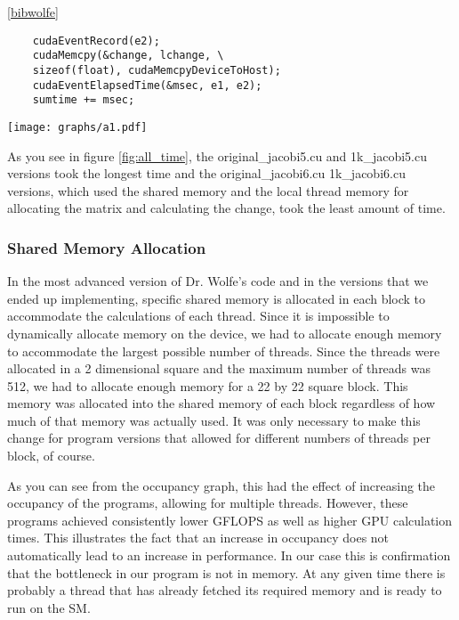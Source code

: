 \documentclass[10pt]{article}
\makeatletter
\newenvironment{figurehere}
{\def\@captype{figure}}
{}
\makeatother
\begin{document}
\begin{multicols}{2}
  \ref{bibwolfe}
  \begin{verbatim}
    cudaEventRecord(e2);
    cudaMemcpy(&change, lchange, \
    sizeof(float), cudaMemcpyDeviceToHost);
    cudaEventElapsedTime(&msec, e1, e2);
    sumtime += msec;
  \end{verbatim}

  \begin{figurehere}
    \centering
    \texttt{[image: graphs/a1.pdf]}
    \caption{}
    \label{fig:all_time}
  \end{figurehere}

  As you see in figure \ref{fig:all_time}, the original\_jacobi5.cu and 1k\_jacobi5.cu versions took the longest time and the original\_jacobi6.cu 1k\_jacobi6.cu versions, which used the shared memory and the local thread memory for allocating the matrix and calculating the change, took the least amount of time.

  \subsubsection{Shared Memory Allocation}%
  In the most advanced version of Dr. Wolfe's code and in the versions that we ended up implementing, specific shared memory is allocated in each block to accommodate the calculations of each thread.
  Since it is impossible to dynamically allocate memory on the device, we had to allocate enough memory to accommodate the largest possible number of threads.
  Since the threads were allocated in a 2 dimensional square and the maximum number of threads was 512, we had to allocate enough memory for a 22 by 22 square block.
  This memory was allocated into the shared memory of each block regardless of how much of that memory was actually used.
  It was only necessary to make this change for program versions that allowed for different numbers of threads per block, of course.

  As you can see from the occupancy graph, this had the effect of increasing the occupancy of the programs, allowing for multiple threads.
  However, these programs achieved consistently lower GFLOPS as well as higher GPU calculation times.
  This illustrates the fact that an increase in occupancy does not automatically lead to an increase in performance.
  In our case this is confirmation that the bottleneck in our program is not in memory.
  At any given time there is probably a thread that has already fetched its required memory and is ready to run on the SM.


\end{multicols}
\end{document}
